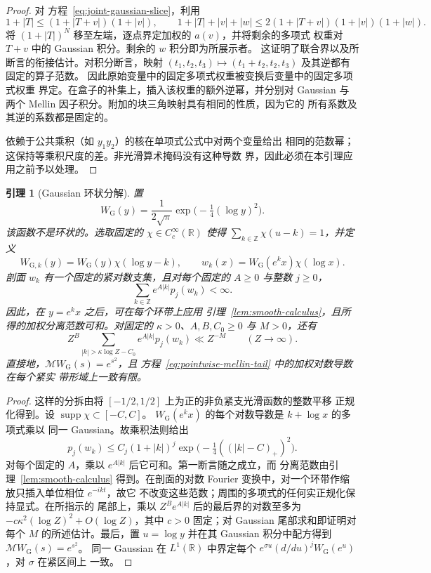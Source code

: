 \documentclass[11pt,a4paper]{article}
\numberwithin{equation}{section}
\numberwithin{figure}{section}
\newtheorem{lemma}[theorem]{引理}
\theoremstyle{definition}
\theoremstyle{remark}
\begin{document}
\begin{proof}
对 方程~\eqref{eq:joint-gaussian-slice}，利用
\[
 1+|T|\le(1+|T+v|)(1+|v|),\qquad
 1+|T|+|v|+|w|\le2(1+|T+v|)(1+|v|)(1+|w|).
\]
将 $(1+|T|)^N$ 移至左端，逐点界定加权的 $a(v)$，并将剩余的多项式
权重对 $T+v$ 中的 Gaussian 积分。剩余的 $w$ 积分即为所展示者。
这证明了联合界以及所断言的衔接估计。对积分断言，映射
$(t_1,t_2,t_3)\mapsto(t_1+t_2,t_2,t_3)$ 及其逆都有固定的算子范数。
因此原始变量中的固定多项式权重被变换后变量中的固定多项式权重
界定。在盒子的补集上，插入该权重的额外逆幂，并分别对 Gaussian 与
两个 Mellin 因子积分。附加的块三角映射具有相同的性质，因为它的
所有系数及其逆的系数都是固定的。

依赖于公共乘积（如 $y_1y_2$）的核在单项式公式中对两个变量给出
相同的范数幂；这保持等乘积尺度的差。非光滑算术掩码没有这种导数
界，因此必须在本引理应用之前予以处理。
\end{proof}

\begin{lemma}[Gaussian 环状分解]\label{lem:gaussian-annular}
置
\[
 W_{\mathrm G}(y)=\frac1{2\sqrt\pi}
                         \exp\bigl(-\tfrac14(\log y)^2\bigr).
\]
该函数不是环状的。选取固定的 $\chi\in C_c^\infty(\mathbb R)$
使得 $\sum_{k\in\mathbb Z}\chi(u-k)=1$，并定义
\[
 W_{{\mathrm G},k}(y)=W_{\mathrm G}(y)\chi(\log y-k),\qquad
 w_k(x)=W_{\mathrm G}(e^k x)\chi(\log x).
\]
剖面 $w_k$ 有一个固定的紧对数支集，且对每个固定的 $A\ge0$ 与整数
$j\ge0$，
\begin{equation}\label{eq:gaussian-annular-sum}
 \sum_{k\in\mathbb Z}e^{A|k|}p_j(w_k)<\infty.
\end{equation}
因此，在 $y=e^k x$ 之后，可在每个环带上应用
引理~\ref{lem:smooth-calculus}，且所得的加权分离范数可和。对固定的
$\kappa>0$、$A,B,C_0\ge0$ 与 $M>0$，还有
\[
 Z^B\sum_{|k|>\kappa\log Z-C_0}e^{A|k|}p_j(w_k)\ll Z^{-M}
       \qquad(Z\to\infty).
\]
直接地，$\mathcal MW_{\mathrm G}(s)=e^{s^2}$，且
方程~\eqref{eq:pointwise-mellin-tail} 中的加权对数导数在每个紧实
带形域上一致有限。
\end{lemma}

\begin{proof}
这样的分拆由将 $[-1/2,1/2]$ 上为正的非负紧支光滑函数的整数平移
正规化得到。设 $\operatorname{supp}\chi\subset[-C,C]$。
$W_{\mathrm G}(e^k x)$ 的每个对数导数是 $k+\log x$ 的多项式乘以
同一 Gaussian。故乘积法则给出
\[
 p_j(w_k)\le C_j(1+|k|)^j
             \exp\bigl(-\tfrac14((|k|-C)_+)^2\bigr).
\]
对每个固定的 $A$，乘以 $e^{A|k|}$ 后它可和。第一断言随之成立，而
分离范数由引理~\ref{lem:smooth-calculus} 得到。在剖面的对数
Fourier 变换中，对一个环带作缩放只插入单位相位 $e^{-ikt}$，故它
不改变这些范数；周围的多项式的任何实正规化保持显式。在所指示的
尾部上，乘以 $Z^Be^{A|k|}$ 后的最后界的对数至多为
$-c\kappa^2(\log Z)^2+O(\log Z)$，其中 $c>0$ 固定；对 Gaussian
尾部求和即证明对每个 $M$ 的所述估计。最后，置 $u=\log y$ 并在其
Gaussian 积分中配方得到 $\mathcal MW_{\mathrm G}(s)=e^{s^2}$。
同一 Gaussian 在 $L^1(\mathbb R)$ 中界定每个
$e^{\sigma u}(d/du)^jW_{\mathrm G}(e^u)$，对 $\sigma$ 在紧区间上
一致。
\end{proof}
\end{document}

